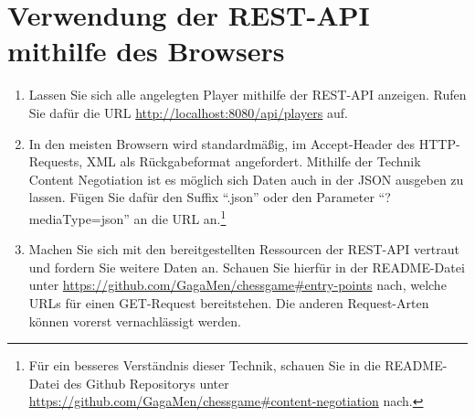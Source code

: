 \section{Verwendung der REST-API mithilfe des Browsers}
\begin{enumerate}
	\item Lassen Sie sich alle angelegten Player mithilfe der \gls{REST}-\gls{API} anzeigen. Rufen Sie dafür die \gls{URL} \url{http://localhost:8080/api/players} auf.
	\item In den meisten Browsern wird standardmäßig, im Accept-Header des \gls{HTTP}-Requests, \acrfull{XML} als Rückgabeformat angefordert. Mithilfe der Technik Content Negotiation ist es möglich sich Daten auch in der \acrfull{JSON} ausgeben zu lassen. Fügen Sie dafür den Suffix \enquote{.json} oder den Parameter \enquote{?mediaType=json} an die \gls{URL} an.\footnote{Für ein besseres Verständnis dieser Technik, schauen Sie in die README-Datei des Github Repositorys unter \url{https://github.com/GagaMen/chessgame\#content-negotiation} nach.}
	\item Machen Sie sich mit den bereitgestellten Ressourcen der \gls{REST}-\gls{API} vertraut und fordern Sie weitere Daten an. Schauen Sie hierfür in der README-Datei unter \url{https://github.com/GagaMen/chessgame\#entry-points} nach, welche \glspl{URL} für einen GET-Request bereitstehen. Die anderen Request-Arten können vorerst vernachlässigt werden.
\end{enumerate}

